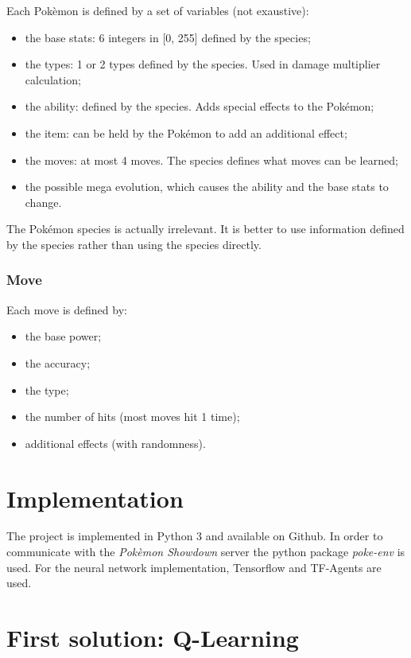 \documentclass{article}
\begin{document}
Each Pokèmon is defined by a set of variables (not exaustive):
\begin{itemize}
    \item the base stats: 6 integers in [0, 255] defined by the species;
    \item the types: 1 or 2 types defined by the species. Used in damage multiplier calculation;
    \item the ability: defined by the species. Adds special effects to the Pokémon;
    \item the item: can be held by the Pokémon to add an additional effect;
    \item the moves: at most 4 moves. The species defines what moves can be learned;
    \item the possible mega evolution, which causes the ability and the base stats to change.
\end{itemize}
The Pokémon species is actually irrelevant.
It is better to use information defined by the species rather than using the species directly.

\subsubsection{Move}

Each move is defined by:
\begin{itemize}
    \item the base power;
    \item the accuracy;
    \item the type;
    \item the number of hits (most moves hit 1 time);
    \item additional effects (with randomness).
\end{itemize}

\section{Implementation}

The project is implemented in Python 3 and available on Github\cite{repo}.
In order to communicate with the \textit{Pokèmon Showdown} server\cite{smogon} the python package \textit{poke-env}\cite{pokeenv} is used.
For the neural network implementation, Tensorflow\cite{tensorflow} and TF-Agents\cite{TFAgents} are used.

\section{First solution: Q-Learning}
\end{document}

